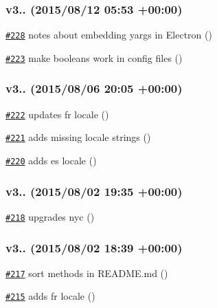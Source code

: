\subsubsection*{v3.. (2015/08/12 05\+:53 +00\+:00)}


\begin{DoxyItemize}
\item \href{https://github.com/bcoe/yargs/pull/228}{\tt \#228} notes about embedding yargs in Electron ()
\item \href{https://github.com/bcoe/yargs/pull/223}{\tt \#223} make booleans work in config files ()
\end{DoxyItemize}

\subsubsection*{v3.. (2015/08/06 20\+:05 +00\+:00)}


\begin{DoxyItemize}
\item \href{https://github.com/bcoe/yargs/pull/222}{\tt \#222} updates fr locale ()
\item \href{https://github.com/bcoe/yargs/pull/221}{\tt \#221} adds missing locale strings ()
\item \href{https://github.com/bcoe/yargs/pull/220}{\tt \#220} adds es locale ()
\end{DoxyItemize}

\subsubsection*{v3.. (2015/08/02 19\+:35 +00\+:00)}


\begin{DoxyItemize}
\item \href{https://github.com/bcoe/yargs/pull/218}{\tt \#218} upgrades nyc ()
\end{DoxyItemize}

\subsubsection*{v3.. (2015/08/02 18\+:39 +00\+:00)}


\begin{DoxyItemize}
\item \href{https://github.com/bcoe/yargs/pull/217}{\tt \#217} sort methods in R\+E\+A\+D\+M\+E.\+md ()
\item \href{https://github.com/bcoe/yargs/pull/215}{\tt \#215} adds fr locale ()
\end{DoxyItemize}

